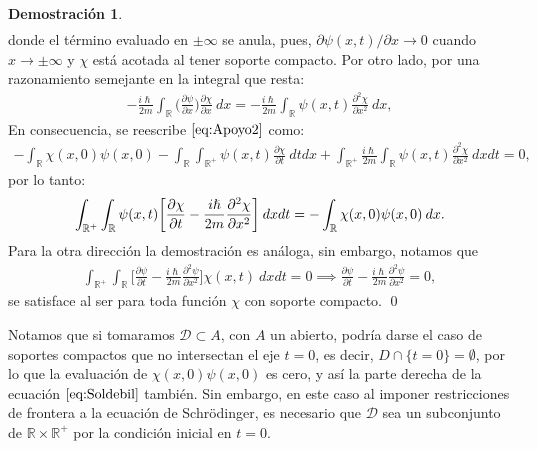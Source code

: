 \documentclass[12pt]{article}
\theoremstyle{definition}
\newtheorem*{demo}{Demostración}
\newcommand*{\field}[1]{\mathbb{#1}}
\begin{document}
\begin{demo}
\begin{align*}
        \end{align*}
        donde el término evaluado en $\pm\infty$ se anula, pues, $\partial\psi(x,t) / \partial x \rightarrow 0$ cuando $x \rightarrow \pm \infty$ y $\chi$ está acotada al tener soporte compacto.
        Por otro lado, por una razonamiento semejante en la integral que resta: \begin{align*}
            - \frac{i\hslash}{2m} \int_{\field{R}}\bigg(\frac{\partial\psi}{\partial x} \bigg)\frac{\partial \chi}{\partial x} \: dx = - \frac{i\hslash}{2m}\int_{\field{R}}\psi(x,t)\frac{\partial ^2\chi}{\partial x^2} \: dx,
        \end{align*} En consecuencia, se reescribe $\eqref{eq:Apoyo2}$ como: \begin{align*}
            -\int_{\field{R}}\chi(x,0)\psi(x,0) - \int_{\field{R}}\int_{\field{R}^+}\psi(x,t)\frac{\partial\chi}{\partial t} \: dt dx + \int_{\field{R}^+}\frac{i\hslash}{2m}\int_{\field{R}}\psi(x,t)\frac{\partial ^2\chi}{\partial x^2} \: dxdt = 0,
        \end{align*}
        por lo tanto:
        \begin{align*}
            \int_{\field{R}^+}\int_{\field{R}}\psi(x,t)\bigg[\frac{\partial\chi}{\partial t}-\frac{i\hslash}{2m}\frac{\partial ^2\chi}{\partial x^2}\bigg]\:dxdt = -\int_{\field{R}}\chi(x,0)\psi(x,0)\:dx.
            \qedhere
        \end{align*}
        Para la otra dirección la demostración es análoga, sin embargo, notamos que
        \begin{align*}
            \int_{\field{R}^+}\int_{\field{R}}\bigg[\frac{\partial\psi}{\partial t} -\frac{i\hslash}{2m}\frac{\partial^2\psi}{\partial x^2}\bigg]\chi(x,t) \:dxdt = 0 \implies \frac{\partial\psi}{\partial t} -
            \frac{i\hslash}{2m}\frac{\partial^2\psi}{\partial x^2} = 0,
        \end{align*}
        se satisface al ser para toda función $\chi$ con soporte compacto. 
        \qed
    \end{demo}
    \noindent
     Notamos que si tomaramos $\mathcal{D}\subset A$, con $A$ un abierto, podría darse el caso de soportes compactos que no intersectan el eje $t = 0$, es decir, $D\cap\{t=0\}=\emptyset$, por lo que la evaluación de $\chi(x,0)\psi(x,0)$ es cero, y así la parte derecha de la ecuación $\eqref{eq:Soldebil}$ también. Sin embargo, en este caso al imponer restricciones de frontera a la ecuación de Schrödinger, es necesario que $\mathcal{D}$ sea un subconjunto de $\field{R}\times\field{R}^{+}$ por la condición inicial en $t=0$.
\end{document}
